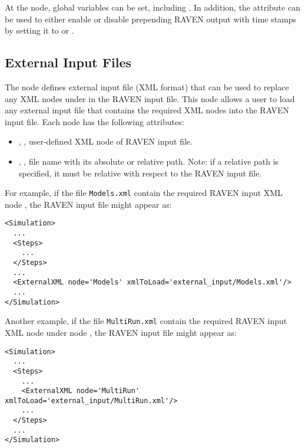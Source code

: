 At the  node, global variables can be set, including .  In addition, the
attribute  can be used to either enable or disable prepending RAVEN output with time stamps
by setting it to  or .


\subsection{External Input Files}
The  node defines external input file (XML format) that can be used to replace any XML nodes 
under  in the RAVEN input file. This node allows a user to load any external input file that contains 
the required XML nodes into the RAVEN input file. Each  node has the following attributes:
\begin{itemize}
\item {}, , user-defined XML node of RAVEN input file. 
\item {}, , file name with its absolute or relative path. Note: if a 
relative path is specified, it must be relative with respect to the RAVEN input file.
\end{itemize}
%
For example, if the file \texttt{Models.xml} contain the required RAVEN input XML node , 
the RAVEN input file might appear as: 
%
\begin{lstlisting}[style=XML,morekeywords={node,xmlToLoad}]  
<Simulation>
  ...
  <Steps>
    ...
  </Steps>
  ...
  <ExternalXML node='Models' xmlToLoad='external_input/Models.xml'/>
  ...
</Simulation>
\end{lstlisting}
%
Another example, if the file \texttt{MultiRun.xml} contain the required RAVEN input XML node  
under node , the RAVEN input file might appear as:
\begin{lstlisting}[style=XML,morekeywords={node,xmlToLoad}]  
<Simulation>
  ...
  <Steps>
    ...
    <ExternalXML node='MultiRun' xmlToLoad='external_input/MultiRun.xml'/>
    ...
  </Steps>
  ...
</Simulation>
\end{lstlisting}
